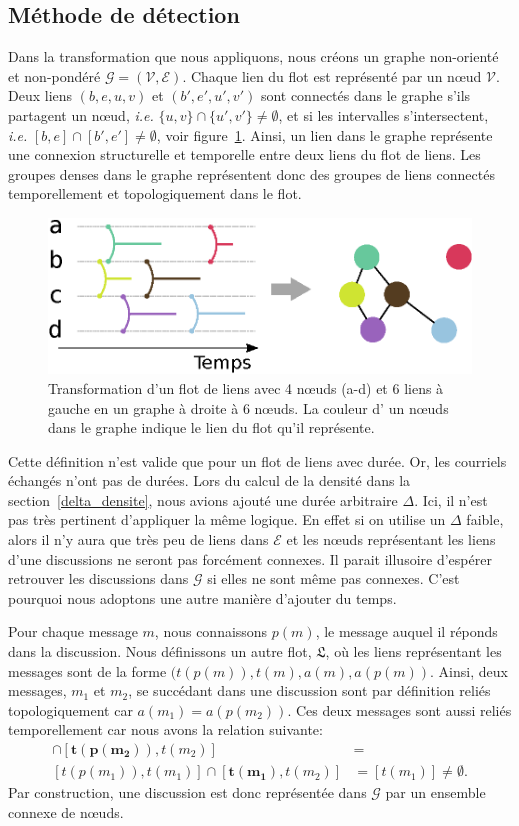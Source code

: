 \subsection{Méthode de détection}

Dans la transformation que nous appliquons, nous créons un graphe non-orienté et non-pondéré $\mathcal{G} = (\mathcal{V},\mathcal{E})$.
Chaque lien du flot est représenté par un n\oe ud $\mathcal{V}$.
Deux liens $(b,e,u,v)$ et $(b',e',u',v')$ sont connectés dans le graphe s'ils partagent un n\oe ud, \emph{i.e.} $\{u,v\} \cap \{u',v'\} \neq \emptyset$, et si les intervalles s'intersectent, \emph{i.e.} $[b,e]\cap[b',e'] \neq \emptyset$, voir figure~\ref{fig:Transformation}.
Ainsi, un lien dans le graphe représente une connexion structurelle et temporelle entre deux liens du flot de liens.
Les groupes denses dans le graphe représentent donc des groupes de liens connectés temporellement et topologiquement dans le flot.

\begin{figure}
\centering
\includegraphics[width=0.6\linewidth]{img/mailing/Transformation.eps}
\caption{Transformation d'un flot de liens avec 4 n\oe uds (a-d) et 6 liens à gauche en un graphe à droite à 6 n\oe uds. La couleur d' un n\oe uds dans le graphe indique le lien du flot qu'il représente.}
\label{fig:Transformation}
\end{figure}%

Cette définition n'est valide que pour un flot de liens avec durée.
Or, les courriels échangés n'ont pas de durées.
Lors du calcul de la densité dans la section~\ref{delta_densite}, nous avions ajouté une durée arbitraire $\Delta$.
Ici, il n'est pas très pertinent d'appliquer la même logique.
En effet si on utilise un $\Delta$ faible, alors il n'y aura que très peu de liens dans $\mathcal{E}$ et les n\oe uds représentant les liens d'une discussions ne seront pas forcément connexes.
Il parait illusoire d'espérer retrouver les discussions dans $\mathcal{G}$ si elles ne sont même pas connexes.
C'est pourquoi nous adoptons une autre manière d'ajouter du temps.

Pour chaque message $m$, nous connaissons $p(m)$, le message auquel il réponds dans la discussion.
Nous définissons un autre flot, $\mathfrak{L}$, où les liens représentant les messages sont de la forme $(t(p(m)),t(m),a(m),a(p(m))$.
Ainsi, deux messages, $m_1$ et $m_2$, se succédant dans une discussion sont par définition reliés topologiquement car $a(m_1)= a(p(m_2))$.
Ces deux messages sont aussi reliés temporellement car  nous avons la relation suivante:
\begin{align*}
[t(p(m_1)),t(m_1)]\cap [\mathbf{t(p(m_2))},t(m_2)] &= \\
[t(p(m_1)),t(m_1)]\cap [\mathbf{t(m_1)},t(m_2)] &= [t(m_1)] \neq \emptyset.
\end{align*}
Par construction, une discussion est donc représentée dans $\mathcal{G}$ par un ensemble connexe de n\oe uds.


